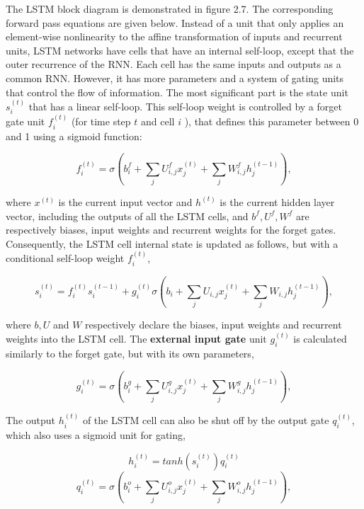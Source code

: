 The LSTM block diagram is demonstrated in figure 2.7.
The corresponding forward pass equations are given below.
Instead of a unit that only applies an element-wise nonlinearity to the affine transformation of inputs and recurrent units, LSTM networks have cells that have an internal self-loop,
except that the outer recurrence of the RNN\@.
Each cell has the same inputs and outputs as a common RNN\@.
However, it has more parameters and a system of gating units that control the flow of information.
The most significant part is the state unit $s^{(t)}_i$ that has a linear self-loop.
This self-loop weight is controlled by a forget gate unit $f^{(t)}_i$ (for time step $t$ and cell $i$ ), that defines this parameter between 0 and 1 using a sigmoid function:

\begin{equation}
    f^{(t)}_i = \sigma (b^f_i + \sum_j U^f_{i,j} x^{(t)}_j + \sum_j W^f_{i,j} h^{(t-1)}_j) ,\label{eq:equation22}
\end{equation}

where $x^{(t)}$ is the current input vector and $h^{(t)}$ is the current hidden layer vector,
including the outputs of all the LSTM cells, and $b^f ,U^f , W^f$ are respectively
biases, input weights and recurrent weights for the forget gates.
Consequently, the LSTM cell internal state is updated as follows, but with a conditional self-loop weight $f^{(t)}_i$,

\begin{equation}
    s^{(t)}_i = f^{(t)}_i s^{(t-1)}_i + g^{(t)}_i \sigma (b_i + \sum_j U_{i,j} x^{(t)}_j + \sum_j W_{i,j} h^{(t-1)}_j) ,\label{eq:equation23}
\end{equation}

where $b, U$ and $W$ respectively declare the biases, input weights and recurrent weights into the LSTM cell.
The \textbf{external input gate} unit $g^{(t)}_i$ is calculated similarly to the forget gate, but with its own parameters,

\begin{equation}
    g^{(t)}_i = \sigma (b^g_i + \sum_j U^g_{i,j} x^{(t)}_j + \sum_j W^g_{i,j} h^{(t-1)}_j) ,\label{eq:equation24}
\end{equation}

The output $h^{(t)}_i$ of the LSTM cell can also be shut off by the output gate $q^{(t)}_i$, which also uses a sigmoid unit for gating,

\begin{equation}
    h^{(t)}_i = tanh(s^{(t)}_i) q^{(t)}_i\label{eq:equation25}
\end{equation}
\begin{equation}
    q^{(t)}_i = \sigma (b^o_i + \sum_j U^o_{i,j} x^{(t)}_j + \sum_j W^o_{i,j} h^{(t-1)}_j) ,\label{eq:equation26}
\end{equation}

